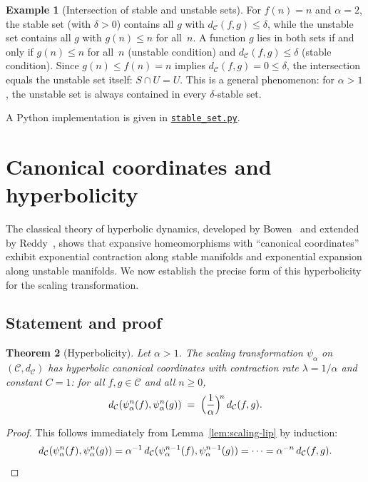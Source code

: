 \documentclass[11pt,a4paper]{article}
\newcommand{\repourl}{https://github.com/guydev42/expansive-homeomorphisms-complexity-qmetric}
\theoremstyle{plain}
\newtheorem{theoreminner}{Theorem}[section]
\theoremstyle{definition}
\newtheorem{exampleinner}[theoreminner]{Example}
\newenvironment{theorem}[1][]{\begin{theoreminner}[#1]}{\end{theoreminner}}
\newenvironment{example}[1][]{\begin{exampleinner}[#1]}{\end{exampleinner}}
\newcommand{\C}{\mathcal{C}}
\begin{document}
\begin{example}[Intersection of stable and unstable sets]\label{ex:stable-unstable-intersect}
For $f(n)=n$ and $\alpha=2$, the stable set (with $\delta>0$)
contains all $g$ with $d_\C(f,g)\le\delta$, while the unstable set
contains all $g$ with $g(n)\le n$ for all~$n$.  A function $g$
lies in both sets if and only if $g(n)\le n$ for all~$n$ (unstable
condition) and $d_\C(f,g)\le\delta$ (stable condition).  Since
$g(n)\le f(n)=n$ implies $d_\C(f,g)=0\le\delta$, the intersection
equals the unstable set itself: $S\cap U = U$.  This is a general
phenomenon: for $\alpha>1$, the unstable set is always contained
in every $\delta$-stable set.
\end{example}

A Python implementation is given in
\href{\repourl/blob/main/code/python/stable_set.py}{\texttt{stable\_set.py}}.


\section{Canonical coordinates and hyperbolicity}
\label{sec:hyperbolicity}

The classical theory of hyperbolic dynamics, developed by
Bowen~\cite{bowen1975} and extended by Reddy~\cite{reddy1983},
shows that expansive homeomorphisms with
``canonical coordinates'' exhibit exponential contraction along
stable manifolds and exponential expansion along unstable
manifolds.  We now establish the precise form of this
hyperbolicity for the scaling transformation.

\subsection{Statement and proof}

\begin{theorem}[Hyperbolicity]\label{thm:hyperbolicity}
Let $\alpha>1$.  The scaling transformation $\psi_\alpha$ on
$(\C,d_\C)$ has hyperbolic canonical coordinates with contraction
rate $\lambda=1/\alpha$ and constant $C=1$: for all $f,g\in\C$
and all $n\ge 0$,
\[
  d_\C(\psi_\alpha^n(f),\psi_\alpha^n(g))
  \;=\; \Bigl(\frac{1}{\alpha}\Bigr)^{\!n}\,d_\C(f,g).
\]
\end{theorem}

\begin{proof}
This follows immediately from Lemma~\ref{lem:scaling-lip} by
induction:
\[
  d_\C(\psi_\alpha^n(f),\psi_\alpha^n(g))
  =\alpha^{-1}\,d_\C(\psi_\alpha^{n-1}(f),\psi_\alpha^{n-1}(g))
  =\cdots=\alpha^{-n}\,d_\C(f,g).  \qedhere
\]
\end{proof}
\end{document}

